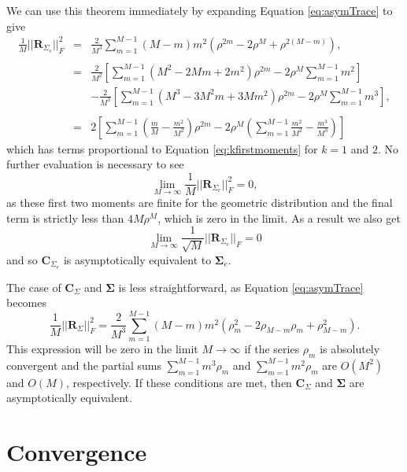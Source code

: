 \documentclass[letterpaper,12pt,oneside,final]{article}
\newcommand{\m}[1]{\mathbf{#1}}               %
\newcommand{\sm}[1]{\boldsymbol{#1}}   %
\newcommand{\norm}[1]{||{#1}||}              %
\newcommand{\frob}[1]{\norm{#1}_F}
\begin{document}
We can use this theorem immediately by expanding Equation \ref{eq:asymTrace} to give
\begin{eqnarray}
  \frac{1}{M} \frob{\m{R}_{\Sigma_e}}^2 & = & \frac{2}{M^3} \sum_{m = 1}^{M-1} (M-m) m^2 \left ( \rho^{2m} - 2 \rho^{M} + \rho^{2(M - m)} \right ), \nonumber \\
  & & \nonumber \\
  & = & \frac{2}{M^2} \left [ \sum_{m = 1}^{M-1} (M^2 - 2Mm + 2m^2) \rho^{2m} - 2 \rho^M \sum_{m = 1}^{M-1} m^2 \right ] \nonumber \\
  & & - \frac{2}{M^3} \left [ \sum_{m = 1}^{M-1} (M^3 - 3M^2m + 3Mm^2) \rho^{2m} - 2 \rho^M \sum_{m = 1}^{M-1} m^3 \right ], \nonumber \\
  & & \nonumber \\
  & = & 2 \left [ \sum_{m = 1}^{M-1} \left ( \frac{m}{M} - \frac{m^2}{M^2} \right ) \rho^{2m} - 2 \rho^M \left ( \sum_{m = 1}^{M-1} \frac{m^2}{M^2} - \frac{m^3}{M^3} \right ) \right ] \label{eq:frobeniussimp}
\end{eqnarray}
which has terms proportional to Equation \ref{eq:kfirstmoments} for $k = 1$ and $2$. No further evaluation is necessary to see
$$ \lim_{M \rightarrow \infty} \frac{1}{M} \frob{\m{R}_{\Sigma_e}}^2 = 0,$$
as these first two moments are finite for the geometric distribution and the final term is strictly less than $4M \rho^M$, which is zero in the limit. As a result we also get
$$ \lim_{M \rightarrow \infty} \frac{1}{\sqrt{M}} \frob{\m{R}_{\Sigma_e}} = 0$$
and so $\m{C}_{\Sigma_e}$ is asymptotically equivalent to $\sm{\Sigma}_e$.

The case of $\m{C}_{\Sigma}$ and $\sm{\Sigma}$ is less straightforward, as Equation \ref{eq:asymTrace} becomes
\begin{equation} \label{eq:nonexponent}
  \frac{1}{M} \frob{\m{R}_{\Sigma}}^2 = \frac{2}{M^3} \sum_{m = 1}^{M-1} (M-m) m^2 \left ( \rho_m^2 - 2 \rho_{M-m} \rho_m + \rho_{M - m}^2 \right ).
\end{equation}
This expression will be zero in the limit $M \rightarrow \infty$ if the series $\rho_m$ is absolutely convergent and the partial sums $\sum_{m = 1}^{M-1}m^3 \rho_m$ and $\sum_{m = 1}^{M-1} m^2 \rho_m$ are $O(M^2)$ and $O(M)$, respectively. If these conditions are met, then $\m{C}_{\Sigma}$ and $\sm{\Sigma}$ are asymptotically equivalent.

\section{Convergence} \label{c:multipleTesting:rateConverge}
  
\end{document}
